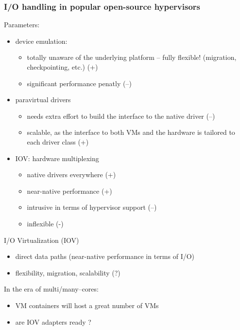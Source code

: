 \documentclass[red,slidestop,notes,compress,mathserif]{beamer}
\begin{document}
\begin{frame}
\frametitle{I/O handling in popular open-source hypervisors}

\begin{block}{Parameters:}
\begin{itemize}
\item device emulation:
\begin{itemize}
\item totally unaware of the underlying platform -- fully flexible! (migration, checkpointing, etc.) (+)
\item significant performance penatly (--)
\end{itemize}
\pause
\item paravirtual drivers
\begin{itemize}
\item needs extra effort to build the interface to the native driver (--)
\item scalable, as the interface to both VMs and the hardware is tailored to each driver class (+)
\end{itemize}
\pause
\item IOV: hardware multiplexing
\begin{itemize}
\item native drivers everywhere (+)
\item near-native performance (+)
\item intrusive in terms of hypervisor support (--)
\item inflexible (-)
\end{itemize}
\end{itemize}
\end{block}
\end{frame}

\begin{frame}
\begin{block}{I/O Virtualization (IOV)}
\begin{itemize}
\item direct data paths (near-native performance in terms of I/O)
\pause
\item flexibility, migration, scalability (?)
\end{itemize}
\end{block}

\pause
\begin{block}{}
In the era of multi/many--cores:
\begin{itemize}
\item VM containers will host a great number of VMs
\item are IOV adapters ready ?
\end{itemize}
\end{block}
\end{frame}
\end{document}
